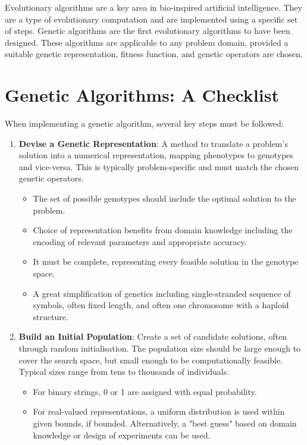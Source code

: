 Evolutionary algorithms are a key area in bio-inspired artificial intelligence.  They are a type of evolutionary computation and are implemented using a specific set of steps. Genetic algorithms are the first evolutionary algorithms to have been designed.  These algorithms are applicable to any problem domain, provided a suitable genetic representation, fitness function, and genetic operators are chosen.

\section{Genetic Algorithms: A Checklist}
When implementing a genetic algorithm, several key steps must be followed:

\begin{enumerate}
    \item \textbf{Devise a Genetic Representation}: A method to translate a problem's solution into a numerical representation, mapping phenotypes to genotypes and vice-versa. This is typically problem-specific and must match the chosen genetic operators.
        \begin{itemize}
        \item  The set of possible genotypes should include the optimal solution to the problem.
        \item Choice of representation benefits from domain knowledge including the encoding of relevant parameters and appropriate accuracy.
        \item  It must be complete, representing every feasible solution in the genotype space.
        \item  A great simplification of genetics including single-stranded sequence of symbols, often fixed length, and often one chromosome with a haploid structure.
        \end{itemize}
    \item \textbf{Build an Initial Population}: Create a set of candidate solutions, often through random initialisation. The population size should be large enough to cover the search space, but small enough to be computationally feasible. Typical sizes range from tens to thousands of individuals.
     \begin{itemize}
         \item For binary strings, 0 or 1 are assigned with equal probability.
        \item For real-valued representations, a uniform distribution is used within given bounds, if bounded. Alternatively, a "best guess" based on domain knowledge or design of experiments can be used.

\end{itemize}
\end{enumerate}
